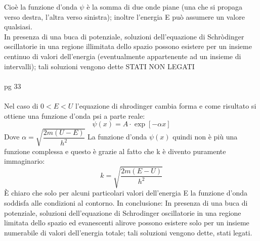 Cioè la funzione d'onda $\psi$ è la somma di due onde piane (una che si propaga verso destra, l'altra verso sinistra); 
inoltre l'energia E può assumere un valore qualsiasi.\\
In presenza di una buca di potenziale, soluzioni dell'equazione di Schròdinger oscillatorie in una regione illimitata dello spazio possono esistere per un insieme centinuo di valori dell'energia (eventualmente appartenente ad un insieme di intervalli); tali soluzioni vengono dette STATI NON LEGATI\\
\\
pg 33 \\
\\
Nel caso di $0<E<U$ l'equazione di shrodinger cambia forma e come risultato si ottiene una funzione d'onda psi a parte reale:
\begin{equation}
    \psi(x)= A\cdot \exp{[-\alpha x]}
\end{equation}
Dove $\alpha=\sqrt{\dfrac{2m(U-E)}{h^2}}$
La funzione d'onda $\psi(x)$ quindi non è più una funzione complessa  e questo è grazie al fatto che k è divento puramente immaginario:
\begin{equation}
    k=\sqrt{\dfrac{2m(E-U)}{h^2}}
\end{equation}
È chiaro che solo per alcuni particolari valori
dell'energia E la funzione d'onda soddisfa alle
condizioni al contorno. In conclusione:
In presenza di una buca di potenziale, soluzioni dell'equazione di
Schrodinger oscillatorie in una regione limitata dello spazio ed evanescenti alirove possono esistere solo per un insieme numerabile di valori dell'energia totale; tali soluzioni vengono dette, stati legati.

